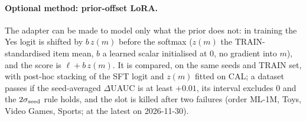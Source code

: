 \paragraph{Optional method: prior-offset LoRA.}\label{sec:slot}
The adapter can be made to model only what the prior does not: in training the Yes logit is shifted by $b\,z(m)$ before the softmax
($z(m)$ the TRAIN-standardised item mean, $b$ a learned scalar initialised at 0, no gradient into $m$), and the score is
$\ell+b\,z(m)$. It is compared, on the same seeds and TRAIN set, with post-hoc stacking of the SFT logit and $z(m)$ fitted on CAL; a
dataset passes if the seed-averaged $\Delta$UAUC is at least $+0.01$, its interval excludes 0 and the $2\sigma_{\rm seed}$ rule holds,
and the slot is killed after two failures (order ML-1M, Toys, Video Games, Sports; at the latest on 2026-11-30).
